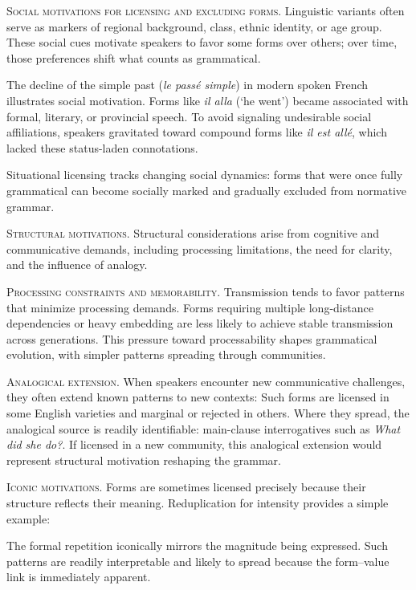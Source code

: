 \documentclass[12pt,letterpaper]{article}
\newcommand{\mention}[1]{\textit{#1}}
\newcommand{\olang}[1]{\textit{#1}}
\begin{document}
\noindent\textsc{Social motivations for licensing and excluding forms.} Linguistic variants often serve as markers of regional background, class, ethnic identity, or age group. These social cues motivate speakers to favor some forms over others; over time, those preferences shift what counts as grammatical.

The decline of the simple past (\olang{le passé simple}) in modern spoken French illustrates social motivation. Forms like \olang{il alla} (`he went') became associated with formal, literary, or provincial speech. To avoid signaling undesirable social affiliations, speakers gravitated toward compound forms like \olang{il est allé}, which lacked these status-laden connotations.

Situational licensing tracks changing social dynamics: forms that were once fully grammatical can become socially marked and gradually excluded from normative grammar.

\noindent\textsc{Structural motivations.} Structural considerations arise from cognitive and communicative demands, including processing limitations, the need for clarity, and the influence of analogy.

\noindent\textsc{Processing constraints and memorability.} Transmission tends to favor patterns that minimize processing demands. Forms requiring multiple long-distance dependencies or heavy embedding are less likely to achieve stable transmission across generations. This pressure toward processability shapes grammatical evolution, with simpler patterns spreading through communities.

\noindent\textsc{Analogical extension.} When speakers encounter new communicative challenges, they often extend known patterns to new contexts:
\ea[\textsuperscript{?}]{\mention{I asked about what did she do.}}
\z
Such forms are licensed in some English varieties and marginal or rejected in others. Where they spread, the analogical source is readily identifiable: main-clause interrogatives such as \mention{What did she do?}. If licensed in a new community, this analogical extension would represent structural motivation reshaping the grammar.

\noindent\textsc{Iconic motivations.} Forms are sometimes licensed precisely because their structure reflects their meaning. Reduplication for intensity provides a simple example:
\ea[]{\mention{a big big problem}}\label{ex:big-big-change}
\z

The formal repetition iconically mirrors the magnitude being expressed. Such patterns are readily interpretable and likely to spread because the form--value link is immediately apparent.
\end{document}
